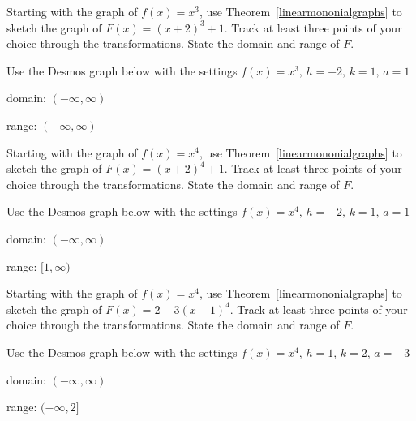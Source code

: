 \documentclass{ximera}
\begin{document}
	\author{Stitz-Zeager}



\begin{problem}\label{polytransfirst}
     Starting with the graph of $f(x) = x^3$, use Theorem~\ref{linearmononialgraphs} to sketch the graph of $F(x) = (x + 2)^{3} + 1$. Track at least three points of your choice through the transformations. State the domain and range of $F$.

\begin{solution}
Use the Desmos graph below with the settings $f(x)=x^3,\,h=-2,\,k=1,\,a=1$

\begin{center} 
\end{center}


domain: $(-\infty, \infty)$

range: $(-\infty, \infty)$

\end{solution}

\end{problem}

\begin{problem}
     Starting with the graph of $f(x) = x^4$, use Theorem~\ref{linearmononialgraphs} to sketch the graph of $F(x) = (x + 2)^{4} + 1$. Track at least three points of your choice through the transformations. State the domain and range of $F$.

\begin{solution}
Use the Desmos graph below with the settings $f(x)=x^4,\,h=-2,\,k=1,\,a=1$

\begin{center} 
\end{center}

domain: $(-\infty, \infty)$

range: $[1, \infty)$

\end{solution}
\end{problem}

\begin{problem}
     Starting with the graph of $f(x) = x^4$, use Theorem~\ref{linearmononialgraphs} to sketch the graph of $F(x) = 2 - 3(x - 1)^{4}$. Track at least three points of your choice through the transformations. State the domain and range of $F$.

\begin{solution}
Use the Desmos graph below with the settings $f(x)=x^4,\,h=1,\,k=2,\,a=-3$

\begin{center} 
\end{center}


domain: $(-\infty, \infty)$

range: $(-\infty, 2]$ 

\end{solution}
\end{problem}
\end{document}
